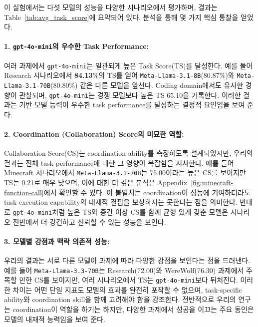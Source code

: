 

이 실험에서는 다섯 모델의 성능을 다양한 시나리오에서 평가하며, 결과는 Table~\ref{tab:avg_task_score}에 요약되어 있다. 분석을 통해 몇 가지 핵심 통찰을 얻었다.

\paragraph{1. \texttt{gpt-4o-mini}의 우수한 Task Performance:}
여러 과제에서 \texttt{gpt-4o-mini}는 일관되게 높은 Task Score(TS)를 달성한다. 예를 들어 Research 시나리오에서 \textbf{84.13}\%의 TS를 얻어 \texttt{Meta-Llama-3.1-8B}(80.87\%)와 \texttt{Meta-Llama-3.1-70B}(80.80\%) 같은 다른 모델을 앞선다. Coding domain에서도 유사한 경향이 관찰되며, \texttt{gpt-4o-mini}는 경쟁 모델보다 높은 TS 65.10을 기록한다. 이러한 결과는 기반 모델 능력이 우수한 task performance를 달성하는 결정적 요인임을 보여 준다.

\paragraph{2. Coordination (Collaboration) Score의 미묘한 역할:}
Collaboration Score(CS)는 coordination ability를 측정하도록 설계되었지만, 우리의 결과는 전체 task performance에 대한 그 영향이 복잡함을 시사한다. 예를 들어 Minecraft 시나리오에서 \texttt{Meta-Llama-3.1-70B}는 75.00이라는 높은 CS를 보이지만 TS는 0.21로 매우 낮으며, 이에 대한 더 깊은 분석은 Appendix~\ref{fig:minecraft-function-call}에서 확인할 수 있다. 이 불일치는 coordination이 성능에 기여하더라도 task execution capability의 내재적 결핍을 보상하지는 못한다는 점을 의미한다. 반대로 \texttt{gpt-4o-mini}처럼 높은 TS와 중간 이상 CS를 함께 균형 있게 갖춘 모델은 시나리오 전반에서 더 강건하고 신뢰할 수 있는 성능을 보인다.

\paragraph{3. 모델별 강점과 맥락 의존적 성능:}
우리의 결과는 서로 다른 모델이 과제에 따라 다양한 강점을 보인다는 점을 드러낸다. 예를 들어 \texttt{Meta-Llama-3.3-70B}는 Research(72.00)와 WereWolf(76.30) 과제에서 주목할 만한 CS를 보이지만, 여러 시나리오에서 TS는 \texttt{gpt-4o-mini}보다 뒤처진다. 이러한 차이는 어떤 단일 지표도 모델의 효과를 완전히 포착할 수 없으며, task-specific ability와 coordination skill을 함께 고려해야 함을 강조한다. 전반적으로 우리의 연구는 coordination이 역할을 하기는 하지만, 다양한 과제에서 성공을 이끄는 주요 동인은 모델의 내재적 능력임을 보여 준다.


